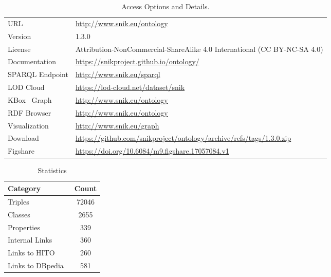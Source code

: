 \documentclass[conference]{IEEEtran}
\newcommand{\citep}{\cite}%
\newcommand{\snikversion}{1.3.0}
\newcommand{\sniktriples}{72046}
\newcommand{\snikclasses}{2655}
\newcommand{\snikproperties}{339}
\newcommand{\sniklinks}{581}
\begin{document}
\begin{table}
\caption{Access Options and Details.%
}
\label{tab:access}
\begin{tabulary}{\columnwidth}{lL}
\toprule
URL						&\url{http://www.snik.eu/ontology}\\
Version					&\snikversion{}\\
License					&Attribution-NonCommercial-ShareAlike 4.0 International (CC BY-NC-SA 4.0)\\
Documentation	&\url{https://snikproject.github.io/ontology/}\\
SPARQL Endpoint			&\url{http://www.snik.eu/sparql}\\
LOD Cloud				&\url{https://lod-cloud.net/dataset/snik}\\
KBox~\cite{kbox} Graph	&\url{http://www.snik.eu/ontology}\\
RDF Browser				&\url{http://www.snik.eu/ontology}\\
Visualization			&\url{http://www.snik.eu/graph}\\
Download				&\url{https://github.com/snikproject/ontology/archive/refs/tags/\snikversion.zip}\\
Figshare				&\url{https://doi.org/10.6084/m9.figshare.17057084.v1}\\
\bottomrule
\end{tabulary}%
\end{table}

\begin{table}
\caption{Statistics}
\label{tab:statistics}
\centering
\begin{tabulary}{\columnwidth}{lS}
\toprule
\textbf{Category}					&\textbf{Count}\\
\midrule
Triples								&\sniktriples{}\\
Classes								&\snikclasses{}\\
Properties							&\snikproperties{}\\
Internal Links						&360\\
Links to HITO~\citep{hitometh2}  	&260\\
Links to DBpedia~\citep{dbpedia} 	&\sniklinks{}\\
\bottomrule
\end{tabulary}%
\end{table}
\end{document}
